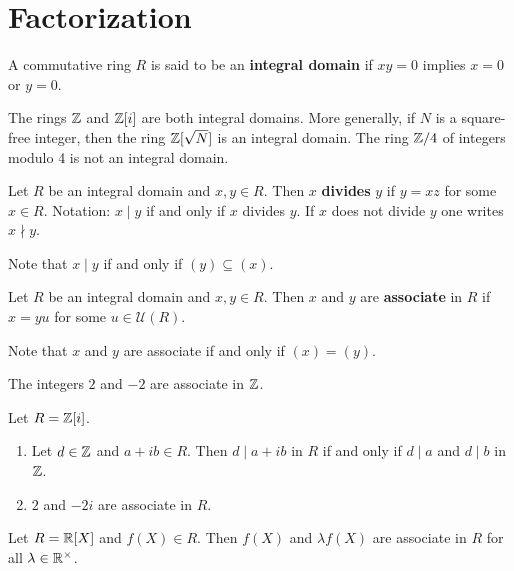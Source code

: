 \chapter{Factorization}

\begin{definition}
	A commutative ring $R$ is said to be an \textbf{integral domain}
	if $xy=0$ implies $x=0$ or $y=0$.  	
\end{definition}

The rings $\mathbb{Z}$ and $\mathbb{Z}[i]$ are both integral domains. 
More generally, if $N$ is a square-free integer, 
then the ring $\mathbb{Z}[\sqrt{N}]$ is an integral domain.  
The ring $\mathbb{Z}/4$ of 
integers modulo 4 is not an integral domain. 

\begin{definition}
	Let $R$ be an integral domain and $x,y\in R$. Then $x$ \textbf{divides} $y$ 
	if $y=xz$ for some $x\in R$. 
	Notation: $x\mid y$ if and only if $x$ divides $y$. If $x$ does not
	divide $y$ one writes $x\nmid y$.  
\end{definition}

Note that $x\mid y$ if and only if $(y)\subseteq (x)$.
	
\begin{definition}
	Let $R$ be an integral domain and $x,y\in R$. Then $x$ and $y$ are
	\textbf{associate} in $R$ if $x=yu$ for some $u\in\mathcal{U}(R)$. 
\end{definition}

Note that $x$ and $y$ are associate if and only if $(x)=(y)$.  

\begin{example}
	The integers $2$ and $-2$ are associate in $\mathbb{Z}$.	
\end{example}

\begin{example}
	Let $R=\mathbb{Z}[i]$. 
	\begin{enumerate}
		\item Let $d\in\mathbb{Z}$ and $a+ib\in R$. Then $d\mid a+ib$ in $R$ if and only if 
			$d\mid a$ and $d\mid b$ in $\mathbb{Z}$. 
		\item $2$ and $-2i$ are associate in $R$.
	\end{enumerate} 	
\end{example}

\begin{example}
	Let $R=\mathbb{R}[X]$ and $f(X)\in R$. Then $f(X)$ and $\lambda f(X)$ are 
	associate in $R$ for all $\lambda\in\mathbb{R}^{\times}$. 	
\end{example}

